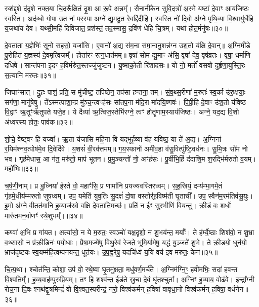 रुश॑द्दृ॒शे द॑दृशे नक्त॒या चि॒दरू᳚क्षितं दृ॒श आ रू॒पे अन्नम्᳚। सैनानी॑केन सुवि॒दत्रो॑ अ॒स्मे यष्टा॑ दे॒वाꣳ आय॑जिष्ठः स्व॒स्ति। अद॑ब्धो गो॒पा उ॒त नः॑ पर॒स्पा अग्ने᳚ द्यु॒मदु॒त रे॒वद्दि॑दीहि। स्व॒स्ति नो॑ दि॒वो अ॑ग्ने पृथि॒व्या वि॒श्वायु॑र्धेहि य॒जथा॑य देव। यथ्सी॒महि॑ दिविजात॒ प्रश॑स्तं॒ तद॒स्मासु॒ द्रवि॑णं धेहि चि॒त्रम्। यथा॑ होत॒र्मनु॑षः॥३०॥

दे॒वता॑ता य॒ज्ञेभिः॑ सूनो सहसो॒ यजा॑सि। ए॒वानो॑ अ॒द्य स॑म॒ना स॑मा॒नानु॒शन्न॑ग्न उश॒तो य॑क्षि दे॒वान्॥ अ॒ग्निमी॑डे पु॒रोहि॑तं य॒ज्ञस्य॑ दे॒वमृ॒त्विजम्᳚। होता॑रꣳ रत्न॒धात॑मम्॥ वृषा॑ सोम द्यु॒माꣳ अ॑सि॒ वृषा॑ देव॒ वृष॑व्रतः। वृषा॒ धर्मा॑णि दधिषे॥ सान्त॑पना इ॒दꣳ ह॒विर्मरु॑त॒स्तज्जु॑जुष्टन। यु॒ष्माको॒ती रि॑शादसः॥ यो नो॒ मर्तो॑ वसवो दुर्\mbox{}हृणा॒युस्ति॒रः स॒त्यानि॑ मरुतः॥३१॥

जिघाꣳ॑सात्। द्रु॒हः पाशं॒ प्रति॒ स मु॑चीष्ट॒ तपि॑ष्ठेन॒ तप॑सा हन्तना॒ तम्। सं॒व॒थ्स॒रीणा॑ म॒रुतः॑ स्व॒र्का उ॑रु॒क्षयाः॒ सग॑णा॒ मानु॑षेषु। ते᳚\-ऽस्मत्पाशा॒न्प्र मु॑ञ्च॒न्त्वꣳह॑सः सांतप॒ना म॑दि॒रा मा॑दयि॒ष्णवः॑। पि॒प्री॒हि दे॒वाꣳ उ॑श॒तो य॑विष्ठ वि॒द्वाꣳ ऋ॒तूꣳर्\mbox{}ऋ॑तुपते यजे॒ह। ये दैव्या॑ ऋ॒त्विज॒स्तेभि॑रग्ने॒ त्वꣳ होतॄ॑णाम॒स्याय॑जिष्ठः। अग्ने॒ यद॒द्य वि॒शो अ॑ध्वरस्य होतः॒ पाव॑क॥३२॥

शो॒चे॒ वेष्ट्वꣳ हि यज्वा᳚। ऋ॒ता य॑जासि महि॒ना वि यद्भूर्\mbox{}ह॒व्या व॑ह यविष्ठ॒ या ते॑ अ॒द्य। अ॒ग्निना॑ र॒यिम॑श्नव॒त्पोष॑मे॒व दि॒वेदि॑वे। य॒शसं॑ वी॒रव॑त्तमम्॥ ग॒य॒स्फानो॑ अमीव॒हा व॑सु॒वित्पु॑ष्टि॒वर्ध॑नः। सु॒मि॒त्रः सो॑म नो भव। गृह॑मेधास॒ आ ग॑त॒ मरु॑तो॒ माप॑ भूतन। प्र॒मु॒ञ्चन्तो॑ नो॒ अꣳह॑सः। पू॒र्वीभि॒र्\mbox{}हि द॑दाशि॒म श॒रद्भि॑र्मरुतो व॒यम्। महो॑भिः॥३३॥

च॒र्\mbox{}ष॒णी॒नाम्। प्र बु॒ध्निया॑ ईरते वो॒ महाꣳ॑सि॒ प्र णामा॑नि प्रयज्यवस्तिरध्वम्। स॒ह॒स्रियं॒ दम्य॑म्भा॒गमे॒तं गृ॑हमे॒धीय॑म्मरुतो जुषध्वम्। उप॒ यमेति॑ युव॒तिः सु॒दक्षं॑ दो॒षा वस्तोर्\mbox{}॑ह॒विष्म॑ती घृ॒ताची᳚। उप॒ स्वैन॑म॒रम॑तिर्वसू॒युः। इ॒मो अ॑ग्ने वी॒तत॑मानि ह॒व्याज॑स्रो वक्षि दे॒वता॑ति॒मच्छ॑। प्रति॑ न ईꣳ सुर॒भीणि॑ वियन्तु। क्री॒डं वः॒ शर्धो॒ मारु॑तमन॒र्वाणꣳ॑ रथे॒शुभम्᳚।॥३४॥

कण्वा॑ अ॒भि प्र गा॑यत। अत्या॑सो॒ न ये म॒रुतः॒ स्वञ्चो॑ यक्ष॒दृशो॒ न शु॒भय॑न्त॒ मर्याः᳚। ते ह॑र्म्ये॒ष्ठाः शिश॑वो॒ न शु॒भ्रा व॒थ्सासो॒ न प्र॑क्री॒डिनः॑ पयो॒धाः। प्रैषा॒मज्मे॑षु विथु॒रेव॑ रेजते॒ भूमि॒र्यामे॑षु॒ यद्ध॑ यु॒ञ्जते॑ शु॒भे। ते क्री॒डयो॒ धुन॑यो॒ भ्राज॑दृष्टयः स्व॒यम्म॑हि॒त्वम्प॑नयन्त॒ धूत॑यः। उ॒प॒ह्व॒रेषु॒ यदचि॑ध्वं य॒यिं वय॑ इव मरुतः॒ केन॑॥३५॥

चि॒त्प॒था। श्चोत॑न्ति॒ कोशा॒ उप॑ वो॒ रथे॒ष्वा घृ॒तमु॑क्षता॒ मधु॑वर्ण॒मर्च॑ते। अ॒ग्निम॑ग्नि॒ꣳ॒ हवी॑मभिः॒ सदा॑ हवन्त वि॒श्पतिम्᳚। ह॒व्य॒वाह॑म्पुरुप्रि॒यम्। तꣳ हि शश्व॑न्त॒ ईड॑ते स्रु॒चा दे॒वं घृ॑त॒श्चुता᳚। अ॒ग्निꣳ ह॒व्याय॒ वोढ॑वे। इन्द्रा᳚ग्नी रोच॒ना दि॒वः श्नथ॑द्वृ॒त्रमिन्द्रं॑ वो वि॒श्वत॒स्परीन्द्रं॒ नरो॒ विश्व॑कर्मन् ह॒विषा॑ वावृधा॒नो विश्व॑कर्मन् ह॒विषा॒ वर्ध॑नेन॥३६॥

